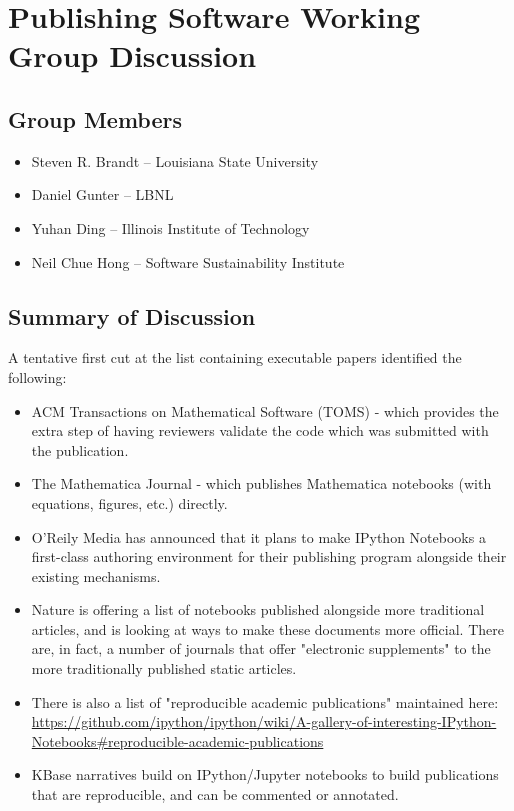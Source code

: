 \section{Publishing Software Working Group Discussion}
\label{sec:appendix_publishing_SW}


\subsection{Group Members}

\begin{itemize}
\item Steven R. Brandt -- Louisiana State University
\item Daniel Gunter -- LBNL
\item Yuhan Ding -- Illinois Institute of Technology
\item Neil Chue Hong -- Software Sustainability Institute
\end{itemize}

\subsection{Summary of Discussion}

A tentative first cut at the list containing executable papers identified the following:

\begin{itemize}
\item ACM Transactions on Mathematical Software (TOMS) - which provides the extra step
 of having reviewers validate the code which was submitted with the publication.
\item The Mathematica Journal - which publishes Mathematica notebooks (with equations,
figures, etc.) directly.
\item O'Reily Media has announced that it plans to make IPython Notebooks a first-class
 authoring environment for their publishing program alongside their existing mechanisms.
\item Nature is offering a list of notebooks published alongside more traditional articles,
 and is looking at ways to make these documents more official. There are, in fact, a
 number of journals that offer "electronic supplements" to the more traditionally published
 static articles.
\item There is also a list of "reproducible academic publications" maintained here:
  \url{https://github.com/ipython/ipython/wiki/A-gallery-of-interesting-IPython-Notebooks#reproducible-academic-publications}
\item KBase narratives build on IPython/Jupyter notebooks to build publications that are
  reproducible, and can be commented or annotated.
\end{itemize}

